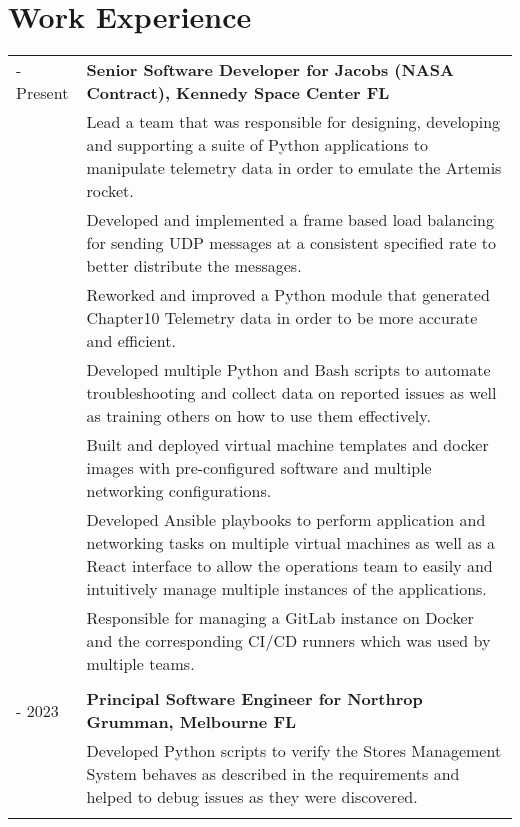 \documentclass[11pt, letterpaper]{article}
\begin{document}
\section*{\selectfont Work Experience}
\vspace{-0.5cm}
\begin{longtable}{p{1in}|p{6in}}
    \centering 2023 - Present & \textbf{Senior Software Developer for Jacobs (NASA Contract), Kennedy Space Center FL} \\&
        Lead a team that was responsible for designing, developing and supporting a suite of Python applications to manipulate telemetry data in order to emulate the Artemis rocket. \vspace{0.2cm} \\&
        Developed and implemented a frame based load balancing for sending UDP messages at a consistent specified rate to better distribute the messages. \vspace{0.2cm} \\&
        Reworked and improved a Python module that generated Chapter10 Telemetry data in order to be more accurate and efficient. \vspace{0.2cm} \\&
        Developed multiple Python and Bash scripts to automate troubleshooting and collect data on reported issues as well as training others on how to use them effectively. \vspace{0.2cm} \\&
        Built and deployed virtual machine templates and docker images with pre-configured software and multiple networking configurations. \vspace{0.2cm} \\&
        Developed Ansible playbooks to perform application and networking tasks on multiple virtual machines as well as a React interface to allow the operations team to easily and intuitively manage multiple instances of the applications. \vspace{0.2cm} \\&
        Responsible for managing a GitLab instance on Docker and the corresponding CI/CD runners which was used by multiple teams. \\
	\multicolumn{2}{c}{}\\
    \centering 2019 - 2023 & \textbf{Principal Software Engineer for Northrop Grumman, Melbourne FL} \vspace{0.1cm} \\&
        Developed Python scripts to verify the Stores Management System behaves as described in the requirements and helped to debug issues as they were discovered. \vspace{0.2cm} \\&

\end{longtable}
\end{document}
